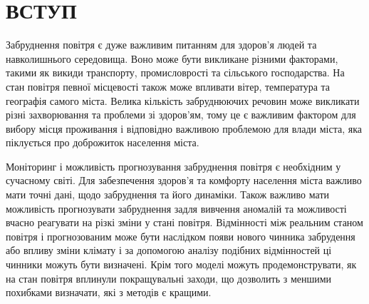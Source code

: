 \chapter*{ВСТУП}

Забруднення повітря є дуже важливим питанням для здоров'я людей та навколишнього середовища.
Воно може бути викликане різними факторами, такими як викиди транспорту, промисловрості та 
сільського господарства. На стан повітря певної місцевості також може впливати вітер, 
температура та географія самого міста. Велика кількість забруднюючих речовин може викликати 
різні захворювання та проблеми зі здоров'ям, тому це є важливим фактором для вибору місця 
проживання і відповідно важливою проблемою для влади міста, яка піклується про доброжиток 
населення міста.


Моніторинг і можливість прогнозування забруднення повітря є необхідним у сучасному світі. 
Для забезпечення здоров'я та комфорту населення міста важливо мати точні дані, щодо забруднення 
та його динаміки. Також важливо мати можливість прогнозувати забруднення задля вивчення 
аномалій та можливості вчасно реагувати на різкі зміни у стані повітря. Відмінності між 
реальним станом повітря і прогнозованим може бути наслідком появи нового чинника забрудення 
або впливу зміни клімату і за допомогою аналізу подібних відмінностей ці чинники можуть 
бути визначені.
Крім того моделі можуть продемонструвати, як на стан повітря вплинули покращувальні заходи,
що дозволить з меншими похибками визначати, які з методів є кращими. 
